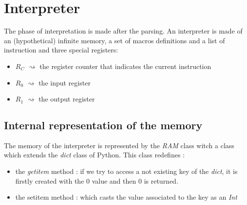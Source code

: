 \section{Interpreter}
\label{sec:interpreter}
The phase of interpretation is made after the parsing. 
An interpreter is made of an (hypothetical) infinite memory, a set of macros definitions and a list of instruction and three special registers:
\begin{itemize}
    \item $R_C$ $\rightsquigarrow$ the register counter that indicates the current instruction
    \item $R_0$ $\rightsquigarrow$ the input register
    \item $R_1$ $\rightsquigarrow$ the output register
\end{itemize}

\subsection{Internal representation of the memory}
The memory of the interpreter is represented by the \textit{RAM} class witch a class which extends the \textit{dict} class of Python.
This class redefines :
\begin{itemize}
    \item the \textit{getitem} method : if we try to access a not existing key of the \textit{dict}, it is firstly created with the $0$ value and then $0$ is returned. 
    \item the setitem method : which casts the value associated to the key as an \textit{Int}
\end{itemize}

